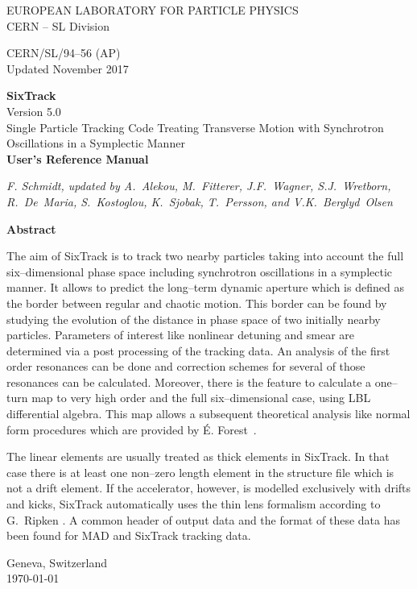 \begin{titlepage}
\begin{center}\normalsize
    EUROPEAN LABORATORY FOR PARTICLE PHYSICS \\
    CERN -- SL Division
\end{center}
\vspace*{2mm}
\begin{flushright}
    CERN/SL/94--56  (AP) \\
    Updated November 2017
\end{flushright}
\begin{center}\LARGE
    {\bf SixTrack} \\
    Version 5.0 \\
    {Single Particle Tracking Code Treating Transverse Motion with Synchrotron Oscillations in a Symplectic Manner} \\
    \vspace*{2mm} {\bf User's Reference Manual}
\end{center}
\begin{center}\em
    F. Schmidt, updated by A.~Alekou, M.~Fitterer, J.F.~Wagner, S.J.~Wretborn, R.~De~Maria, S.~Kostoglou, K.~Sjobak, T.~Persson, and V.K.~Berglyd~Olsen
\end{center}
\begin{center}\large
    {\bf Abstract} \\
\end{center}
The aim of SixTrack is to track two nearby particles taking into account the full six--dimensional phase space including synchrotron oscillations in a symplectic manner.
It allows to predict the long--term dynamic aperture which is defined as the border between regular and chaotic motion.
This border can be found by studying the evolution of the distance in phase space of two initially nearby particles.
Parameters of interest like nonlinear detuning and smear are determined via a post processing of the tracking data.
An analysis of the first order resonances can be done and correction schemes for several of those resonances can be calculated.
Moreover, there is the feature to calculate a one--turn map to very high order and the full six--dimensional case, using LBL differential algebra.
This map allows a subsequent theoretical analysis like normal form procedures which are provided by \'{E}. Forest~\cite{DALIE}.

The linear elements are usually treated as thick elements in SixTrack\@.
In that case there is at least one non--zero length element in the structure file which is not a drift element.
If the accelerator, however, is modelled exclusively with drifts and kicks, SixTrack automatically uses the thin lens formalism according to G.~Ripken \cite{Ripken95}.
A common header of output data and the format of these data has been found for MAD and SixTrack tracking data.

\vfill
\begin{center}
    Geneva, Switzerland \\
    \today
\end{center}

\end{titlepage}
